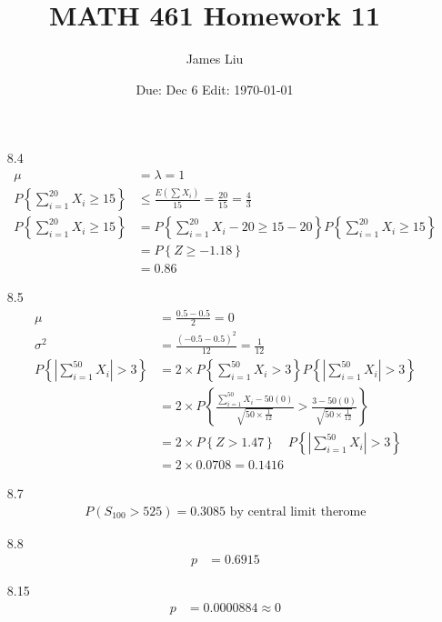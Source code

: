 \documentclass{article}
\date{Due: Dec 6 Edit: \today}
\title{MATH 461 Homework 11}
\author{James Liu}
\begin{document}
\maketitle
\begin{itemize}
    \item [8.4]
    \begin{align*}
        \mu&=\lambda=1\\
        P\left\{\sum_{i=1}^{20}X_i\geq 15\right\}&\leq\frac{E(\sum X_i)}{15}=\frac{20}{15}=\frac{4}{3}\\
        P\left\{\sum_{i=1}^{20} X_i \geq 15\right\} &= P\left\{\sum_{i=1}^{20} X_i - 20 \geq 15 - 20\right\}P\left\{\sum_{i=1}^{20} X_i \geq 15\right\}\\
        &=P\left\{Z\geq -1.18\right\}\\
        &=0.86
    \end{align*}
    \item [8.5]
    \begin{align*}
        \mu &=\frac{0.5-0.5}{2}=0\\
        \sigma^2&=\frac{(-0.5-0.5)^2}{12}=\frac{1}{12}\\
        P\left\{\left|\sum_{i=1}^{50} X_i\right| > 3\right\} &= 2 \times P\left\{\sum_{i=1}^{50} X_i > 3\right\}P\left\{\left|\sum_{i=1}^{50} X_i\right| > 3\right\} \\
        &= 2 \times P\left\{\frac{\sum_{i=1}^{50} X_i - 50(0)}{\sqrt{50 \times \frac{1}{12}}} > \frac{3 - 50(0)}{\sqrt{50 \times \frac{1}{12}}}\right\}\\
        &= 2 \times P\left\{Z > 1.47\right\} \quad P\left\{\left|\sum_{i=1}^{50} X_i\right| > 3\right\}\\
        &= 2 \times 0.0708 = 0.1416
    \end{align*}
    \item [8.7]
    \begin{align*}
        P(S_{100}>525)=0.3085 \text{ by central limit therome}
    \end{align*}
    \item [8.8]
    \begin{align*}
        p &= 0.6915    
    \end{align*}
    \item [8.15]
    \begin{align*}
        p &= 0.0000884 \approx 0
    \end{align*}
\end{itemize}
\end{document}
